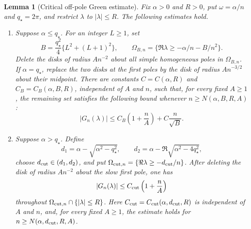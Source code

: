 \documentclass[twoside,10pt]{article}
\numberwithin{equation}{section}
\theoremstyle{slbody}
\newtheorem{lemma}[theorem]{Lemma}
\theoremstyle{definition}
\theoremstyle{remark}
\begin{document}
\begin{lemma}[Critical off-pole Green estimate]
\label{lem:critical-green-off-pole}
Fix $\alpha>0$ and $R>0$, put $\omega=\alpha/n$ and $q_\star=2\pi$, and
restrict $\lambda$ to $|\lambda|\le R$.  The following estimates hold.
\begin{enumerate}
\item Suppose $\alpha\le q_\star$.  For an integer $L\ge1$, set
  \[
   B=\frac{q_\star^2}{4}\{L^2+(L+1)^2\},\qquad
   \Omega_{B,n}=\{\Re\lambda\ge-\alpha/n-B/n^2\}.
  \]
  Delete the disks of radius $A n^{-2}$ about all simple homogeneous
  poles in $\Omega_{B,n}$.  If $\alpha=q_\star$, replace the two disks at the
  first poles by the disk of radius $A n^{-3/2}$ about their midpoint.
  There are constants $C=C(\alpha,R)$ and $C_B=C_B(\alpha,B,R)$,
  independent of $A$ and $n$, such that, for every fixed $A\ge1$, the
  remaining set satisfies the following bound whenever
  $n\ge N(\alpha,B,R,A)$:
  \begin{equation}\label{eq:critical-green-exclusion-bound}
   |G_n(\lambda)|\le
      C_B\left(1+\frac nA\right)+C\frac n{\sqrt B}.
  \end{equation}
\item Suppose $\alpha>q_\star$.  Define
  \[
   d_1=\alpha-\sqrt{\alpha^2-q_\star^2},\qquad
   d_2=\alpha-\Re\sqrt{\alpha^2-4q_\star^2},
  \]
  choose $d_{\rm cut}\in(d_1,d_2)$, and put
  $\Omega_{{\rm cut},n}=\{\Re\lambda\ge-d_{\rm cut}/n\}$.  After
  deleting the disk of radius $A n^{-2}$ about the slow first pole, one has
  \begin{equation}\label{eq:critical-green-exclusion-bound-super}
    |G_n(\lambda)|\le C_{\rm cut}\left(1+\frac nA\right)
  \end{equation}
  throughout $\Omega_{{\rm cut},n}\cap\{|\lambda|\le R\}$.  Here
  $C_{\rm cut}=C_{\rm cut}(\alpha,d_{\rm cut},R)$ is independent of
  $A$ and $n$, and, for every
  fixed $A\ge1$, the estimate holds for
  $n\ge N(\alpha,d_{\rm cut},R,A)$.
\end{enumerate}
\end{lemma}
\end{document}
